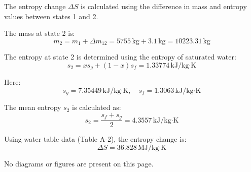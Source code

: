 The entropy change \( \Delta S \) is calculated using the difference in mass and entropy values between states 1 and 2.  

The mass at state 2 is:  
\[
m_2 = m_1 + \Delta m_{12} = 5755 \, \text{kg} + 3.1 \, \text{kg} = 10223.31 \, \text{kg}
\]  

The entropy at state 2 is determined using the entropy of saturated water:  
\[
s_2 = x s_g + (1 - x) s_f = 1.33774 \, \text{kJ/kg·K}
\]  

Here:  
\[
s_g = 7.35449 \, \text{kJ/kg·K}, \quad s_f = 1.3063 \, \text{kJ/kg·K}
\]  

The mean entropy \( s_2 \) is calculated as:  
\[
s_2 = \frac{s_f + s_g}{2} = 4.3557 \, \text{kJ/kg·K}
\]  

Using water table data (Table A-2), the entropy change is:  
\[
\Delta S = 36.828 \, \text{MJ/kg·K}
\]  

No diagrams or figures are present on this page.